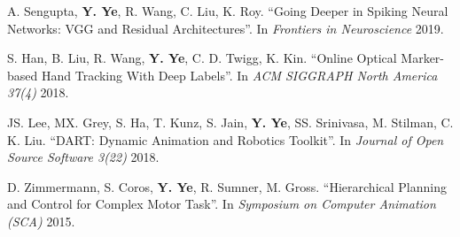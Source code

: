 \documentclass[margin,line]{res}
\begin{document}
\begin{resume}





\vspace*{-.1in}
A. Sengupta, {\bf Y. Ye}, R. Wang, C. Liu, K. Roy. ``Going Deeper in Spiking Neural Networks: VGG and Residual Architectures''. In {\em Frontiers in Neuroscience} 2019.

\vspace*{-.1in}
S. Han, B. Liu, R. Wang, {\bf Y. Ye}, C. D. Twigg, K. Kin. ``Online Optical Marker-based Hand Tracking With Deep Labels''. In {\em ACM SIGGRAPH North America 37(4)} 2018.

\vspace*{-.1in}
JS. Lee, MX. Grey, S. Ha, T. Kunz, S. Jain, {\bf Y. Ye}, SS. Srinivasa, M. Stilman, C. K. Liu. ``DART: Dynamic Animation and Robotics Toolkit''. In {\em Journal of Open Source Software 3(22)} 2018.

\vspace*{-.1in}
D. Zimmermann, S. Coros, {\bf Y. Ye}, R. Sumner, M. Gross. ``Hierarchical Planning and Control for Complex Motor Task''. In {\em Symposium on Computer Animation (SCA)} 2015.



\end{resume}
\end{document}
